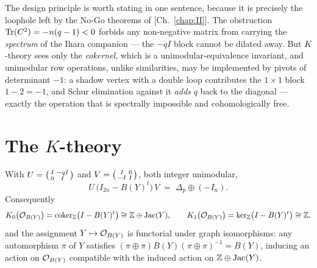 The design principle is worth stating in one sentence, because it is precisely the
loophole left by the No-Go theorems of [Ch.~\ref{chap:II}]. The obstruction
$\operatorname{Tr}(C^2)=-n(q-1)<0$ forbids any non-negative matrix from carrying the
\emph{spectrum} of the Ihara companion --- the $-qI$ block cannot be dilated away.
But $K$-theory sees only the \emph{cokernel}, which is a unimodular-equivalence
invariant, and unimodular row operations, unlike similarities, may be implemented by
pivots of determinant $-1$: a shadow vertex with a double loop contributes the
$1\times1$ block $1-2=-1$, and Schur elimination against it \emph{adds} $q$ back to
the diagonal --- exactly the operation that is spectrally impossible and
cohomologically free.

\section{The \texorpdfstring{$K$}{K}-theory}\label{VI:sec:ktheory}

\begin{theorem}\label{VI:thm:ktheory}
With $U=\begin{psmallmatrix}I&-qI\\0&I\end{psmallmatrix}$ and
$V=\begin{psmallmatrix}I&0\\-I&I\end{psmallmatrix}$, both integer unimodular,
\begin{equation}\label{VI:eq:factor}
U\,\bigl(I_{2n}-B(Y)^t\bigr)\,V\;=\;\Delta_p\oplus(-I_n).
\end{equation}
Consequently
\[
K_0\bigl(\mathcal{O}_{B(Y)}\bigr)=\operatorname{coker}_{\mathbb{Z}}\bigl(I-B(Y)^t\bigr)\cong\mathbb{Z}\oplus\operatorname{Jac}(Y),
\qquad
K_1\bigl(\mathcal{O}_{B(Y)}\bigr)=\ker_{\mathbb{Z}}\bigl(I-B(Y)^t\bigr)\cong\mathbb{Z} ,
\]
and the assignment $Y\mapsto\mathcal{O}_{B(Y)}$ is functorial under graph isomorphisms: any
automorphism $\pi$ of $Y$ satisfies $(\pi\oplus\pi)B(Y)(\pi\oplus\pi)^{-1}=B(Y)$,
inducing an action on $\mathcal{O}_{B(Y)}$ compatible with the induced action on
$\mathbb{Z}\oplus\operatorname{Jac}(Y)$.
\end{theorem}

